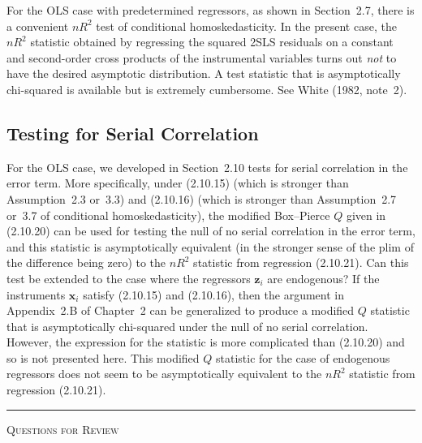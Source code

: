 For the OLS case with predetermined regressors, as shown in Section~2.7, there
is a convenient $nR^2$ test of conditional homoskedasticity.  In the present case, the
$nR^2$ statistic obtained by regressing the squared 2SLS residuals on a constant and
second-order cross products of the instrumental variables turns out \emph{not} to have the
desired asymptotic distribution.  A test statistic that is asymptotically chi-squared
is available but is extremely cumbersome.  See White (1982, note~2).

\subsection*{Testing for Serial Correlation}

For the OLS case, we developed in Section~2.10 tests for serial correlation in the
error term.  More specifically, under (2.10.15) (which is stronger than Assumption~2.3
or~3.3) and (2.10.16) (which is stronger than Assumption~2.7 or~3.7 of conditional
homoskedasticity), the modified Box--Pierce $Q$ given in (2.10.20) can be used for
testing the null of no serial correlation in the error term, and this statistic is
asymptotically equivalent (in the stronger sense of the plim of the difference being
zero) to the $nR^2$ statistic from regression (2.10.21).  Can this test be extended to the
case where the regressors $\mathbf{z}_i$ are endogenous?  If the instruments $\mathbf{x}_i$ satisfy
(2.10.15) and (2.10.16), then the argument in Appendix~2.B of Chapter~2 can be
generalized to produce a modified $Q$ statistic that is asymptotically chi-squared under
the null of no serial correlation.  However, the expression for the statistic is more
complicated than (2.10.20) and so is not presented here.  This modified $Q$ statistic for
the case of endogenous regressors does not seem to be asymptotically equivalent to
the $nR^2$ statistic from regression (2.10.21).

\bigskip
\begin{center}\rule{0.6\textwidth}{0.4pt}\end{center}
\noindent\textsc{Questions for Review}
\medskip

